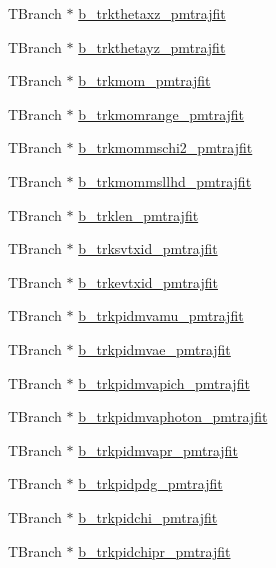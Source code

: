 \begin{DoxyCompactItemize}
\item 
T\-Branch $\ast$ \hyperlink{classanatree_a9606a4cfabbb7b0adfcef803d6db1131}{b\-\_\-trkthetaxz\-\_\-pmtrajfit}
\item 
T\-Branch $\ast$ \hyperlink{classanatree_a219a796f1d82ae675f90bb95d61d9e65}{b\-\_\-trkthetayz\-\_\-pmtrajfit}
\item 
T\-Branch $\ast$ \hyperlink{classanatree_a781605818c6f79fcf0c72bb92e4afb45}{b\-\_\-trkmom\-\_\-pmtrajfit}
\item 
T\-Branch $\ast$ \hyperlink{classanatree_a430966eda9ee3cf3962961fe2bd6e1bc}{b\-\_\-trkmomrange\-\_\-pmtrajfit}
\item 
T\-Branch $\ast$ \hyperlink{classanatree_a557be6df8e770fb10e08bd2d01324af9}{b\-\_\-trkmommschi2\-\_\-pmtrajfit}
\item 
T\-Branch $\ast$ \hyperlink{classanatree_ab136c765473d3eeaa83e913d1cf7a844}{b\-\_\-trkmommsllhd\-\_\-pmtrajfit}
\item 
T\-Branch $\ast$ \hyperlink{classanatree_a1184afcee9212f636e62a54a4adb7f3c}{b\-\_\-trklen\-\_\-pmtrajfit}
\item 
T\-Branch $\ast$ \hyperlink{classanatree_aefc586e24cd56120d09725a6de46a4ac}{b\-\_\-trksvtxid\-\_\-pmtrajfit}
\item 
T\-Branch $\ast$ \hyperlink{classanatree_a2213c41f2c43fb483c8209689c99fc8c}{b\-\_\-trkevtxid\-\_\-pmtrajfit}
\item 
T\-Branch $\ast$ \hyperlink{classanatree_af25f24668d25368a9bf068a008a72021}{b\-\_\-trkpidmvamu\-\_\-pmtrajfit}
\item 
T\-Branch $\ast$ \hyperlink{classanatree_a63a9deeb4d5292fc52be7c3cd0e9a315}{b\-\_\-trkpidmvae\-\_\-pmtrajfit}
\item 
T\-Branch $\ast$ \hyperlink{classanatree_a8408bbce06d2e4f22c75ebe5f3370892}{b\-\_\-trkpidmvapich\-\_\-pmtrajfit}
\item 
T\-Branch $\ast$ \hyperlink{classanatree_a3b7f84588633763988e73c91b6fbd9ef}{b\-\_\-trkpidmvaphoton\-\_\-pmtrajfit}
\item 
T\-Branch $\ast$ \hyperlink{classanatree_ac793badcec7bba686785d6f9b2b2c746}{b\-\_\-trkpidmvapr\-\_\-pmtrajfit}
\item 
T\-Branch $\ast$ \hyperlink{classanatree_aa08aff9328f4f4ef62d0e102e49bc7c2}{b\-\_\-trkpidpdg\-\_\-pmtrajfit}
\item 
T\-Branch $\ast$ \hyperlink{classanatree_a51107d835cbb9642a5764d9945f63d9c}{b\-\_\-trkpidchi\-\_\-pmtrajfit}
\item 
T\-Branch $\ast$ \hyperlink{classanatree_ac5a1d422dd967dfe00e3645d422ce49e}{b\-\_\-trkpidchipr\-\_\-pmtrajfit}

\end{DoxyCompactItemize}
